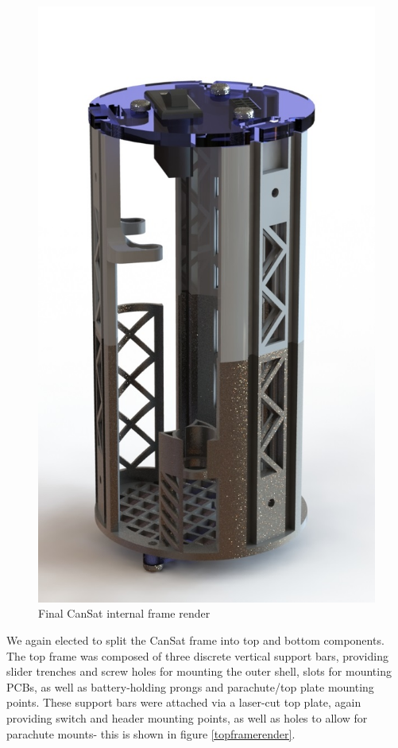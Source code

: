 \documentclass[]{report}
\begin{document}
\begin{figure}[h]
	\hfill\includegraphics[scale=0.4]{cansat_internal_frame_render.jpg}\hspace*{\fill}
	\caption{Final CanSat internal frame render}
	\label{newframerender}
\end{figure}

We again elected to split the CanSat frame into top and bottom components. The top frame was composed of three discrete vertical support bars, providing slider trenches and screw holes for mounting the outer shell, slots for mounting PCBs, as well as battery-holding prongs and parachute/top plate mounting points. These support bars were attached via a laser-cut top plate, again providing switch and header mounting points, as well as holes to allow for parachute mounts- this is shown in figure \ref{topframerender}.
\end{document}
